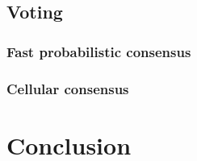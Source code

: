 \documentclass{article}
\begin{document}
\subsection{Voting}\label{sec:voting}


\subsubsection{Fast probabilistic consensus}


\subsubsection{Cellular consensus}


\section{Conclusion}\label{sec:conclusion}


\clearpage


\end{document}
